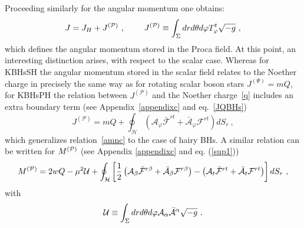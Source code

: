 \documentclass{article}
\numberwithin{equation}{section}
\begin{document}
%
Proceeding similarly for the angular momentum one obtains:
\begin{equation}
J=J_H+J^{(\mathcal{P})} \ , \ \qquad  J^{({\cal P})}\equiv  \int_{\Sigma} dr d\theta d\varphi T^t_\varphi \sqrt{-g} \ ,
\label{amd}
\end{equation}
which defines the angular momentum stored in the Proca field. At this point, an interesting distinction arises, with respect to the scalar case. 
 Whereas for KBHsSH the angular momentum stored in the scalar field relates to the Noether charge in precisely the same way as for rotating scalar boson stars $J^{(\Psi)}=mQ$, for KBHsPH the relation between $J^{(\mathcal{P})} $ and  the Noether charge~\eqref{q} includes an extra boundary term (see Appendix~\ref{appendixc} and eq.~\eqref{JQBHs})
\begin{equation}
\label{nr1}
J^{(\mathcal{P})}=mQ+ \oint_\mathcal{H}  ({\mathcal{A}}_\varphi \bar{ {\mathcal{F}}}^{r t}+\bar{\mathcal{A}}_\varphi { {\mathcal{F}}}^{r t}  ) dS_r \ ,
\end{equation}
which generalizes relation~\eqref{amnc} to the case of hairy BHs. 
A similar relation can be written for $M^{({\cal P})}$ (see Appendix \ref{appendixc}
and eq. (\ref{sup1}))
\begin{equation}
\label{nr2}
M^{({\cal P})}=2w Q
-\mu^2  {\cal U}
+ \oint_\mathcal{H}  
\left[
\frac{1}{2} 
\left(
{\mathcal{A}}_\beta \bar{ {\mathcal{F}}}^{r \beta}+\bar{\mathcal{A}}_\beta { {\mathcal{F}}}^{r \beta}
\right)
-\left({\mathcal{A}}_t \bar{ {\mathcal{F}}}^{r t}+\bar{\mathcal{A}}_t { {\mathcal{F}}}^{r t}
\right)  
\right] dS_r \ ,
\end{equation}
with
\begin{equation}
\label{U}
{\cal U}\equiv \int _\Sigma  dr d\theta d\varphi  {\mathcal{A}}_\alpha \bar {\mathcal{A}}^\alpha \sqrt{-g}\ .
\end{equation}
\end{document}
